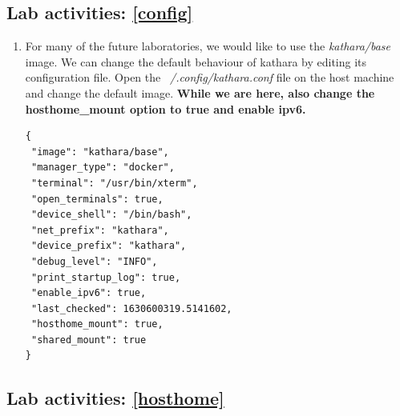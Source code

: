 \documentclass[12pt]{book}
\begin{document}
\subsection{Lab activities: \ref{config}}

\begin{enumerate}[resume*]
\item For many of the future laboratories, we would like to use the \emph{kathara/base} image. We can change the default behaviour of kathara by editing its configuration file. Open the \emph{~/.config/kathara.conf} file on the host machine and change the default image. \textbf{While we are here, also change the hosthome\_mount option to true and enable ipv6.}
\begin{lstlisting}
{
 "image": "kathara/base",
 "manager_type": "docker",
 "terminal": "/usr/bin/xterm",
 "open_terminals": true,
 "device_shell": "/bin/bash",
 "net_prefix": "kathara",
 "device_prefix": "kathara",
 "debug_level": "INFO",
 "print_startup_log": true,
 "enable_ipv6": true,
 "last_checked": 1630600319.5141602,
 "hosthome_mount": true,
 "shared_mount": true
}
\end{lstlisting}
\end{enumerate}

\subsection{Lab activities: \ref{hosthome}}
\end{document}
